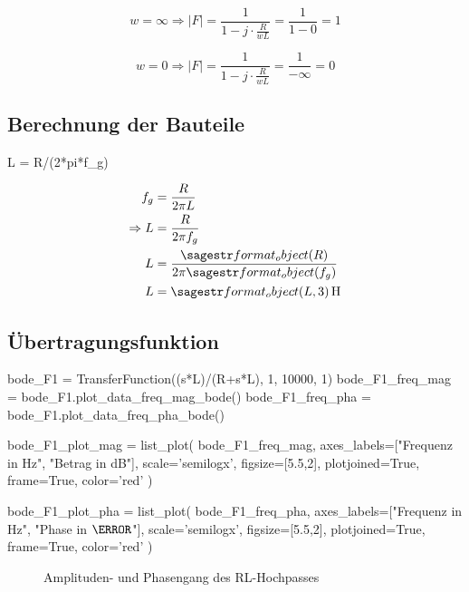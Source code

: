 \begin{equation*}
    w = \infty \Rightarrow |F| = \frac{1}{1 - j \cdot \frac{R}{wL}} = \frac{1}{1 - 0} = 1
\end{equation*}

\begin{equation*}
    w = 0 \Rightarrow |F| = \frac{1}{1 - j \cdot \frac{R}{wL}} = \frac{1}{- \infty} = 0
\end{equation*}

\subsection{Berechnung der Bauteile}

\begin{sagesilent}
    L = R/(2*pi*f_g)
\end{sagesilent}

\begin{align*}
    f_{g} &= \frac{R}{2 \pi L} \\
    \Rightarrow L &= \frac{R}{2 \pi f_{g}} \\
    L &= \frac{\var{R}}{2 \pi \var{f_g}} \\
    L &= \SIvar{L, 3}{\henry}
\end{align*}

\subsection{Übertragungsfunktion}

\begin{sagesilent}
    bode_F1 = TransferFunction((s*L)/(R+s*L), 1, 10000, 1)
    bode_F1_freq_mag = bode_F1.plot_data_freq_mag_bode()
    bode_F1_freq_pha = bode_F1.plot_data_freq_pha_bode()

    bode_F1_plot_mag = list_plot(
        bode_F1_freq_mag,
        axes_labels=["Frequenz in Hz", "Betrag in dB"],
        scale='semilogx',
        figsize=[5.5,2],
        plotjoined=True,
        frame=True,
        color='red'
    )

    bode_F1_plot_pha = list_plot(
        bode_F1_freq_pha,
        axes_labels=["Frequenz in Hz", "Phase in $\degree$"],
        scale='semilogx',
        figsize=[5.5,2],
        plotjoined=True,
        frame=True,
        color='red'
    )
\end{sagesilent}

\begin{figure}[H]
    \centering
    \begin{subfigure}{\textwidth}
        \centering
    \end{subfigure}
    \quad
    \begin{subfigure}{\textwidth}
        \centering
    \end{subfigure}
    \caption{Amplituden- und Phasengang des RL-Hochpasses}
    \label{fig:F1}
\end{figure}

